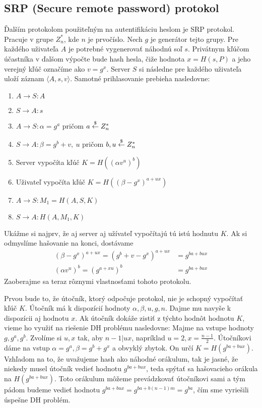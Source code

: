 \subsection{SRP (Secure remote password) protokol}

Ďalším protokolom použiteľným na autentifikáciu heslom je SRP protokol.
Pracuje v grupe $Z_n^{*}$, kde $n$ je prvočíslo. Nech $g$ je generátor
tejto grupy.
Pre každého uživateľa $A$ je potrebné vygenerovať náhodnú soľ $s$.
Privátnym kľúčom účastníka v ďalšom výpočte bude hash hesla, čiže
hodnota $x = H(s,P)$ a jeho verejný kľúč označíme ako $v = g^x$.
Server $S$ si následne
pre každého uživateľa uloží záznam $\langle A, s, v \rangle$.
Samotné prihlasovanie prebieha nasledovne:
\begin{enumerate}
\item $A\to S\colon A$
\item $S\to A\colon s$
\item $A\to S\colon \alpha = g^a$ pričom $a \overset{\$}{\leftarrow} Z_n^{*}$
\item $S\to A\colon \beta = g^b + v,\ u$ pričom $b,u \overset{\$}{\leftarrow} Z_n^{*}$
\item Server vypočíta kľúč $K = H((\alpha v^u)^b)$
\item Uživateľ vypočíta kľúč $K = H((\beta - g^x)^{a+ux})$
\item $A\to S\colon M_1 = H(A,S,K)$
\item $S\to A\colon H(A,M_1,K)$
\end{enumerate}

Ukážme si najprv, že aj server aj užívateľ vypočítajú tú istú hodnutu $K$.
Ak si odmyslíme hašovanie na konci, dostávame
\begin{align*}
(\beta - g^x)^{a+ux} = (g^b + v - g^x)^{a+ux} &= g^{ba+bux}\\
(\alpha v^u)^b = (g^{a+xu})^b &= g^{ba+bux}
\end{align*}
Zaoberajme sa teraz rôznymi vlastnosťami tohoto protokolu.

Prvou bude to, že útočník, ktorý odpočuje protokol,
nie je schopný vypočítať kľúč $K$.
Útočník má k dispozícií hodnoty $\alpha, \beta, u, g, n$.
Dajme mu navyše k dispozícii aj hodnotu $x$.
Ak útočník dokáže zistiť z týchto hodnôt hodnotu $K$,
vieme ho využiť na riešenie DH problému nasledovne:
Majme na vstupe hodnoty $g, g^a, g^b$. Zvolíme si $u,x$ tak, 
aby $n-1 | ux$, napríklad $u = 2, x = \frac{n-1}{2}$.
Útočníkovi dáme na vstup $\alpha = g^a, \beta = g^b + g^x$ a obvyklý zbytok.
On určí $K = H(g^{ba+bux})$. 
Vzhľadom na to, že uvažujeme hash ako náhodné orákulum,
tak je jasné, že niekedy musel útočník vedieť hodnotu $g^{ba+bux}$,
teda spýtať sa hašovacieho orákula na $H(g^{ba+bux})$.
Toto orákulum môžeme prevádzkovať útočníkovi sami a
tým pádom budeme vedieť hodnotu
$g^{ba+bux} = g^{ba+b(n-1)m} = g^{ba}$,
čím sme vyriešili úspešne DH problém.

